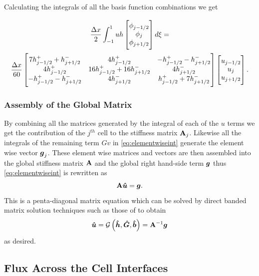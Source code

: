 Calculating the integrals of all the basis function combinations we get

\begin{multline}
\frac{\Delta x}{2}\int_{-1 }^{1}  uh \begin{bmatrix} \TM
\phi_{j-1/2}\\\phi_j \\\phi_{j+1/2} \BM
\end{bmatrix} d\xi =  \\  \frac{\Delta x}{60} \begin{bmatrix} \TM
7 h^+_{j-1/2} + h^-_{j+1/2} & 4 h^+_{j-1/2}   & - h^+_{j-1/2} - h^-_{j+1/2}\\ 4 h^+_{j-1/2} & 16 h^+_{j-1/2} + 16 h^-_{j+1/2}& 4 h^-_{j+1/2}\\ - h^+_{j-1/2} - h^-_{j+1/2} &  4 h^-_{j+1/2} &  h^+_{j-1/2} + 7 h^-_{j+1/2} \BM
\end{bmatrix}  \begin{bmatrix} \TM
u_{j-1/2}\\u_j \\u _{j+1/2} \BM
\end{bmatrix}.
\label{eqn:FEMutermexample}
\end{multline}
\subsubsection{Assembly of the Global Matrix}
By combining all the matrices generated by the integral of each of the $u$ terms we get the contribution of the $j^{th}$ cell to the stiffness matrix $\mathbf{A}_j$. Likewise all the integrals of the remaining term $Gv$ in \eqref{eq:elementwiseint} generate the element wise vector $\boldsymbol{g}_{j}$. These element wise matrices and vectors are then assembled into the global stiffness matrix $\mathbf{A}$ and the global right hand-side term  $\boldsymbol{g}$ thus \eqref{eq:elementwiseint} is rewritten as
\begin{equation}
\label{eqn:FEMElemMatrixJ}
 \mathbf{A} \boldsymbol{\hat{u}} = \boldsymbol{g}.
\end{equation}
This is a penta-diagonal matrix equation which can be solved by direct banded matrix solution techniques such as those of \citet{NumRecC-1996} to obtain
\begin{equation}
\boldsymbol{\hat{u}} =\mathcal{G}\left( \boldsymbol{\hat{h}}, \boldsymbol{\hat{G}},\boldsymbol{\hat{b}} \right) =   \mathbf{A}^{-1}\boldsymbol{g}
\label{eqn:usolvefromGhb}
\end{equation}
as desired.
\subsection{Flux Across the Cell Interfaces}

